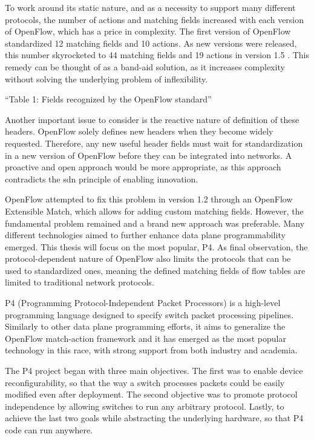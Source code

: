 To work around its static nature, and as a necessity to support many different protocols, the number of actions and matching fields increased with each version of OpenFlow, which has a price in complexity. The first version of OpenFlow standardized 12 matching fields and 10 actions. As new versions were released, this number skyrocketed to 44 matching fields and 19 actions in version 1.5 \cite{li_protocol_2017}\cite{bosshart_p4_2014}. This remedy can be thought of as a band-aid solution, as it increases complexity without solving the underlying problem of inflexibility.

“Table 1: Fields recognized by the OpenFlow standard” \cite{bosshart_p4_2014}

Another important issue to consider is the reactive nature of definition of these headers. OpenFlow solely defines new headers when they become widely requested. Therefore, any new useful header fields must wait for standardization in a new version of OpenFlow before they can be integrated into networks. A proactive and open approach would be more appropriate, as this approach contradicts the \gls{sdn} principle of enabling innovation. \cite{li_protocol_2017}

OpenFlow attempted to fix this problem in version 1.2 through an OpenFlow Extensible Match, which allows for adding custom matching fields\cite{kreutz_software-defined_2015}. However, the fundamental problem remained and a brand new approach was preferable. Many different technologies aimed to further enhance data plane programmability emerged. This thesis will focus on the most popular, P4.
As final observation, the protocol-dependent nature of OpenFlow also limits the protocols that can be used to standardized ones, meaning the defined matching fields of flow tables are limited to traditional network protocols. 

P4 (Programming Protocol-Independent Packet Processors) is a high-level programming language designed to specify switch packet processing pipelines. Similarly to other data plane programming efforts, it aims to generalize the OpenFlow match-action framework and it has emerged as the most popular technology in this race, with strong support from both industry and academia\cite{hauser_survey_2021}.

The P4 project began with three main objectives\cite{bosshart_p4_2014}. The first was to enable device reconfigurability, so that the way a switch processes packets could be easily modified even after deployment. The second objective was to promote protocol independence by allowing switches to run any arbitrary protocol. Lastly, to achieve the last two goals while abstracting the underlying hardware, so that P4 code can run anywhere. 

